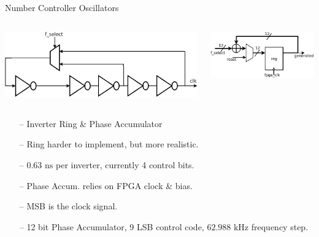 \documentclass{beamer}
\begin{document}
\begin{frame}{Number Controller Oscillators}
  	\begin{columns}
    \begin{center}
  	\includegraphics[scale=0.175]{../inverter_chain}
    \end{center}
    \begin{center}
    \includegraphics[scale=0.325]{../phase_accum}
    \end{center}
    \end{columns}
    \vspace{1 cm}	
	\begin{itemize}
		\item[--]
            Inverter Ring \& Phase Accumulator
        \item[--]
            Ring harder to implement, but more realistic.
        \item[--]
            $0.63\textrm{ ns}$ per inverter, currently 4 control bits.
        \item[--]
        	Phase Accum. relies on FPGA clock \& bias.
        \item[--]
            MSB is the clock signal.
        \item[--]
        	12 bit Phase Accumulator, 9 LSB control code, $62.988\textrm{ kHz}$ frequency step.
    \end{itemize}
\end{frame}
\end{document}
